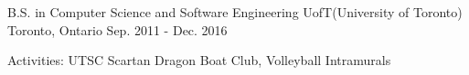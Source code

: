 

\begin{cventries}



  \cventry
    {B.S. in Computer Science and Software Engineering} %
    {UofT(University of Toronto)} %
    {Toronto, Ontario} %
    {Sep. 2011 - Dec. 2016} %
    {
      \begin{cvitems} %
        {Activities: UTSC Scartan Dragon Boat Club, Volleyball Intramurals}
      \end{cvitems}
    }

\end{cventries}
